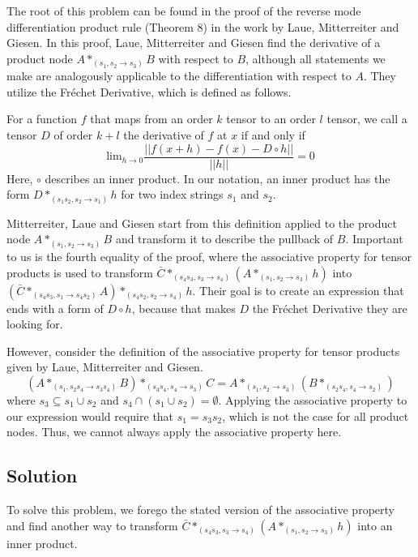 \documentclass[12pt, a4paper]{report}
\begin{document}
The root of this problem can be found in the proof of the reverse mode differentiation product rule (Theorem 8) in the work \cite{tensorpaper} by Laue, Mitterreiter and Giesen.
In this proof, Laue, Mitterreiter and Giesen find the derivative of a product node $A *_{(s_1, s_2 \rightarrow s_3)} B$ with respect to $B$, although all statements we make are analogously applicable to the differentiation with respect to $A$.
They utilize the Fr\'{e}chet Derivative, which is defined as follows.

For a function $f$ that maps from an order $k$ tensor to an order $l$ tensor, we call a tensor $D$ of order $k+l$ the derivative of $f$ at $x$ if and only if
$$
\text{lim}_{h \rightarrow 0} \frac{||f(x+h) - f(x) - D \circ h||}{||h||} = 0
$$
Here, $\circ$ describes an inner product.
In our notation, an inner product has the form $D *_{(s_1 s_2, s_2 \rightarrow s_1)} h$ for two index strings $s_1$ and $s_2$.

Mitterreiter, Laue and Giesen start from this definition applied to the product node $A *_{(s_1, s_2 \rightarrow s_3)} B$ and transform it to describe the pullback of $B$.
Important to us is the fourth equality of the proof, where the associative property for tensor products is used to transform $\bar{C} *_{(s_4s_3,s_3 \rightarrow s_4)} (A *_{(s_1,s_2 \rightarrow s_3)} h)$ into $(\bar{C} *_{(s_4s_3,s_1 \rightarrow s_4s_2)} A) *_{(s_4s_2,s_2 \rightarrow s_4)} h$.
Their goal is to create an expression that ends with a form of $D \circ h$, because that makes $D$ the Fr\'{e}chet Derivative they are looking for.

However, consider the definition of the associative property for tensor products given by Laue, Mitterreiter and Giesen.
$$
(A *_{(s_1, s_2 s_4 \rightarrow s_3 s_4)} B) *_{(s_3 s_4, s_4 \rightarrow s_3)} C = A *_{(s_1, s_2 \rightarrow s_3)} (B *_{(s_2 s_4, s_4 \rightarrow s_2)})
$$
where $s_3 \subseteq s_1 \cup s_2$ and $s_4 \cap (s_1 \cup s_2) = \emptyset$. 
Applying the associative property to our expression would require that $s_1 = s_3 s_2$, which is not the case for all product nodes.
Thus, we cannot always apply the associative property here.

\subsection{Solution}
To solve this problem, we forego the stated version of the associative property and find another way to transform $\bar{C} *_{(s_4s_3,s_3 \rightarrow s_4)} (A *_{(s_1,s_2 \rightarrow s_3)} h)$ into an inner product.
\end{document}
